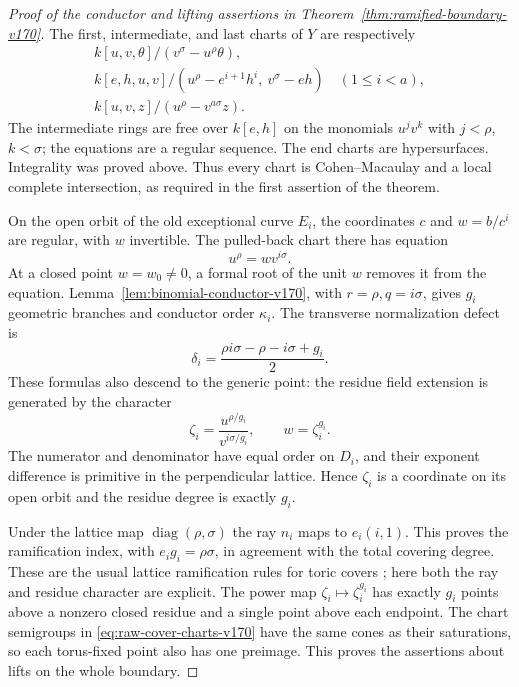 \begin{proof}[Proof of the conductor and lifting assertions in
Theorem~\ref{thm:ramified-boundary-v170}]
The first, intermediate, and last charts of $Y$ are respectively
\begin{equation}\label{eq:raw-cover-charts-v170}
 \begin{gathered}
 k[u,v,\theta]/(v^\sigma-u^\rho\theta),\\
 k[e,h,u,v]/(u^\rho-e^{i+1}h^i,\ v^\sigma-eh)
                  \quad(1\leq i<a),\\
 k[u,v,z]/(u^\rho-v^{a\sigma}z).
 \end{gathered}
\end{equation}
The intermediate rings are free over $k[e,h]$ on the monomials
$u^jv^k$ with $j<\rho$, $k<\sigma$; the equations are a regular
sequence. The end charts are hypersurfaces. Integrality was proved
above. Thus every chart is Cohen--Macaulay and a local complete
intersection, as required in the first assertion of the theorem.

On the open orbit of the old exceptional curve $E_i$, the coordinates
$c$ and $w=b/c^i$ are regular, with $w$ invertible. The pulled-back
chart there has equation
\begin{equation}\label{eq:transverse-binomial-v170}
 u^\rho=w v^{i\sigma}.
\end{equation}
At a closed point $w=w_0\ne0$, a formal root of the unit $w$ removes
it from the equation. Lemma~\ref{lem:binomial-conductor-v170}, with
$r=\rho,q=i\sigma$, gives $g_i$ geometric branches and conductor
order $\kappa_i$. The transverse normalization defect is
\begin{equation}\label{eq:delta-defect-v170}
 \delta_i=\frac{\rho i\sigma-\rho-i\sigma+g_i}{2}.
\end{equation}
These formulas also descend to the generic point: the residue field
extension is generated by the character
\begin{equation}\label{eq:root-residue-v170}
 \zeta_i=\frac{u^{\rho/g_i}}{v^{i\sigma/g_i}},\qquad
 w=\zeta_i^{g_i}.
\end{equation}
The numerator and denominator have equal order on $D_i$, and their
exponent difference is primitive in the perpendicular lattice. Hence
$\zeta_i$ is a coordinate on its open orbit and the residue degree
is exactly $g_i$.

Under the lattice map $\operatorname{diag}(\rho,\sigma)$ the ray
$n_i$ maps to $e_i(i,1)$. This proves the ramification index, with
$e_i g_i=\rho\sigma$, in agreement with the total covering degree.
These are the usual lattice ramification rules for toric covers
\cite[Definition~1 and Lemma~1]{AlexeevPardini170}; here both the
ray and residue character are explicit. The power map
$\zeta_i\mapsto\zeta_i^{g_i}$ has exactly $g_i$ points above a
nonzero closed residue and a single point above each endpoint.
The chart semigroups in \eqref{eq:raw-cover-charts-v170} have the
same cones as their saturations, so each torus-fixed point also has
one preimage. This proves the assertions about lifts on the whole
boundary.


\end{proof}
